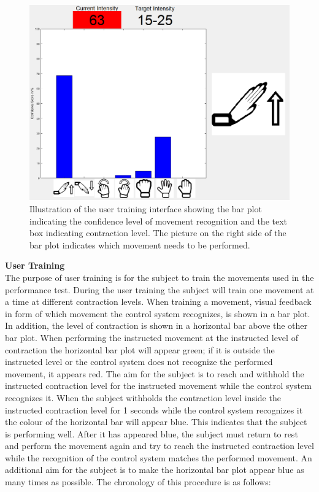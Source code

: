 \begin{figure}[H]                 
	\includegraphics[width=.6\textwidth]{figures/xBackground/usertraintestGUI}  
	\caption{Illustration of the user training interface showing the bar plot indicating the confidence level of movement recognition and the text box indicating contraction level. The picture on the right side of the bar plot indicates which movement needs to be performed.}
	\label{fig:usertraintestGUI} 
\end{figure}

\textbf{User Training} \\ %
The purpose of user training is for the subject to train the movements used in the performance test. During the user training the subject will train one movement at a time at different contraction levels. When training a movement, visual feedback in form of which movement the control system recognizes, is shown in a bar plot. In addition, the level of contraction is shown in a horizontal bar above the other bar plot. When performing the instructed movement at the instructed level of contraction the horizontal bar plot will appear green; if it is outside the instructed level or the control system does not recognize the performed movement, it appears red. The aim for the subject is to reach and withhold the instructed contraction level for the instructed movement while the control system recognizes it. When the subject withholds the contraction level inside the instructed contraction level for 1 seconds while the control system recognizes it the colour of the horizontal bar will appear blue. This indicates that the subject is performing well. After it has appeared blue, the subject must return to rest and perform the movement again and try to reach the instructed contraction level while the recognition of the control system matches the performed movement. An additional aim for the subject is to make the horizontal bar plot appear blue as many times as possible. The chronology of this procedure is as follows:

